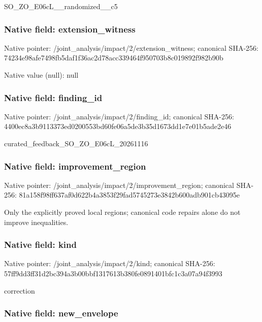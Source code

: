 \documentclass[10pt,a4paper]{article}
\begin{document}
SO\_ZO\_E06cL\_\_randomized\_\_c5


\subsubsection{Native field: extension\_witness}


Native pointer: /joint\_analysis/impact/2\allowbreak{}/extension\_witness; canonical SHA-256: 74234e98afe7498fb5daf1f3\allowbreak{}6ac2d78acc339464f950703b\allowbreak{}8c019892f982b90b



Native value (null): null



\subsubsection{Native field: finding\_id}


Native pointer: /joint\_analysis/impact/2/finding\_id; canonical SHA-256: 4400ec8a3b9113373ed02005\allowbreak{}53bd60fe06a5de3b35d1673d\allowbreak{}d1e7e01b5ade2e46


curated\_feedback\_SO\_ZO\_E06cL\_20261116


\subsubsection{Native field: improvement\_region}


Native pointer: /joint\_analysis/impact/2\allowbreak{}/improvement\_region; canonical SHA-256: 81a158f98ff637af0d622b4a\allowbreak{}3853f29fad5745273e3842b6\allowbreak{}00adb901cb43095e


Only the explicitly proved local regions; canonical code repairs alone do not improve inequalities.


\subsubsection{Native field: kind}


Native pointer: /joint\_analysis/impact/2/kind; canonical SHA-256: 57ff9dd3ff31d2bc394a3b00\allowbreak{}bbf1317613b380fe0891401b\allowbreak{}fc1c3a07a94f3993


correction


\subsubsection{Native field: new\_envelope}
\end{document}
